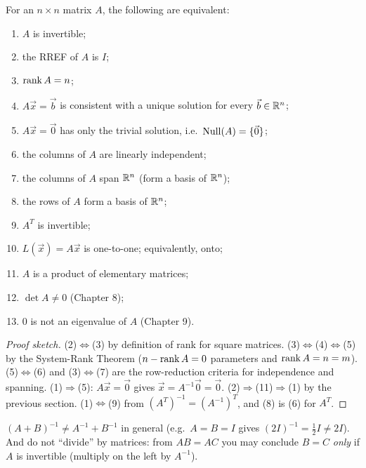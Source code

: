 \begin{theorem}
For an $n\times n$ matrix $A$, the following are equivalent:
\begin{enumerate}
  \item $A$ is invertible;
  \item the RREF of $A$ is $I$;
  \item $\operatorname{rank} A=n$;
  \item $A\vec x=\vec b$ is consistent with a unique solution for every $\vec b\in\mathbb{R}^n$;
  \item $A\vec x=\vec 0$ has only the trivial solution, i.e.\ $\operatorname{Null}(A)=\{\vec 0\}$;
  \item the columns of $A$ are linearly independent;
  \item the columns of $A$ span $\mathbb{R}^n$ (form a basis of $\mathbb{R}^n$);
  \item the rows of $A$ form a basis of $\mathbb{R}^n$;
  \item $A^T$ is invertible;
  \item $L(\vec x)=A\vec x$ is one-to-one; equivalently, onto;
  \item $A$ is a product of elementary matrices;
  \item $\det A\neq 0$ (Chapter 8);
  \item $0$ is not an eigenvalue of $A$ (Chapter 9).
\end{enumerate}
\end{theorem}
\begin{proof}[Proof sketch]
(2)$\Leftrightarrow$(3) by definition of rank for square matrices. (3)$\Leftrightarrow$(4)$\Leftrightarrow$(5)
by the System-Rank Theorem ($n-\operatorname{rank} A=0$ parameters and $\operatorname{rank} A=n=m$). (5)$\Leftrightarrow$(6) and
(3)$\Leftrightarrow$(7) are the row-reduction criteria for independence and spanning. (1)$\Rightarrow$(5):
$A\vec x=\vec0$ gives $\vec x=A^{-1}\vec0=\vec 0$. (2)$\Rightarrow$(11)$\Rightarrow$(1) by the previous
section. (1)$\Leftrightarrow$(9) from $(A^T)^{-1}=(A^{-1})^T$, and (8) is (6) for $A^T$.
\end{proof}

\begin{important}[Pitfalls]
$(A+B)^{-1}\neq A^{-1}+B^{-1}$ in general (e.g.\ $A=B=I$ gives $(2I)^{-1}=\frac12I\ne 2I$).
And do not ``divide'' by matrices: from $AB=AC$ you may conclude $B=C$ \emph{only} if $A$ is
invertible (multiply on the left by $A^{-1}$).
\end{important}

